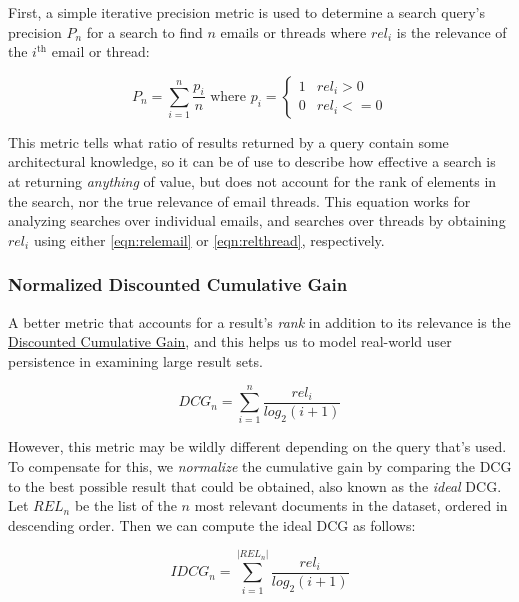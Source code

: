 \documentclass[a4paper, 12pt]{article}
\begin{document}
			First, a simple iterative precision metric is used to determine a search query's precision $ P_n $ for a search to find $ n $ emails or threads where $ rel_i $ is the relevance of the $ i^{\text{th}} $ email or thread:
			
			\begin{equation}
				\tag{Search Precision}
				P_n = \sum_{i = 1}^{n} \frac{p_i}{n}
				\text{ where } p_i =
				\begin{cases}
					1 & rel_i > 0 \\
					0 & rel_i <= 0
				\end{cases}
				\label{eqn:precision}
			\end{equation}
		
			This metric tells what ratio of results returned by a query contain some architectural knowledge, so it can be of use to describe how effective a search is at returning \textit{anything} of value, but does not account for the rank of elements in the search, nor the true relevance of email threads. This equation works for analyzing searches over individual emails, and searches over threads by obtaining $ rel_i $ using either \eqref{eqn:relemail} or \eqref{eqn:relthread}, respectively.
			
		\subsubsection{Normalized Discounted Cumulative Gain}
			A better metric that accounts for a result's \textit{rank} in addition to its relevance is the \href{}{Discounted Cumulative Gain}, and this helps us to model real-world user persistence in examining large result sets\cite{jarvelin}.

			\begin{equation}
				\tag{DCG}
				DCG_n = \sum_{i=1}^{n} \frac{rel_i}{log_2(i + 1)}
				\label{eqn:dcg}
			\end{equation}
			
			However, this metric may be wildly different depending on the query that's used. To compensate for this, we \textit{normalize} the cumulative gain by comparing the DCG to the best possible result that could be obtained, also known as the \textit{ideal} DCG\cite{stanfordslides}. Let $ REL_n $ be the list of the $ n $ most relevant documents in the dataset, ordered in descending order. Then we can compute the ideal DCG as follows:
			
			\begin{equation}
				\tag{IDCG}
				IDCG_n = \sum_{i=1}^{|REL_n|} \frac{rel_i}{log_2(i + 1)}
				\label{eqn:idcg}
			\end{equation}
		
\end{document}

